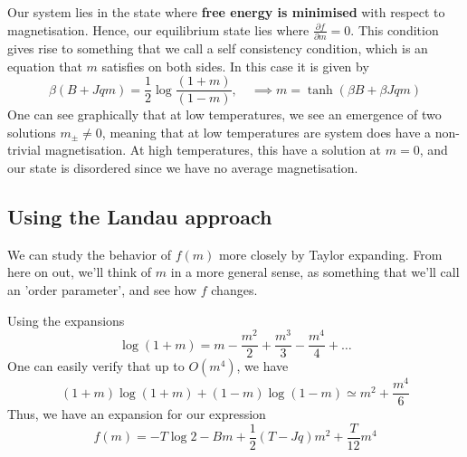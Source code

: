 \documentclass[11pt, oneside]{article}   	%
\begin{document}
Our system lies in the state where \textbf{free energy is minimised} with respect to magnetisation. Hence, our equilibrium state lies where $\frac{ \partial f }{ \partial m }  = 0 $. 
This condition gives rise to something that we call a self consistency condition, which is an equation that $m$ satisfies on both sides. In this case it is given by 
\[ 
	\beta ( B + Jqm ) = \frac{ 1}{2} \log \frac{ ( 1+ m )}{ ( 1- m ) }, \quad \implies m = \tanh ( \beta B + \beta J q m ) \]
One can see graphically that at low temperatures, we see an emergence of two solutions $m_{ \pm  } \neq 0$, meaning that at low temperatures are system does have a non-trivial magnetisation. At high temperatures, this have a solution at $m = 0$, and our state is disordered since we have no average magnetisation. 
 
\subsection{Using the Landau approach} 
We can study the behavior of $f(m)$ more closely by Taylor expanding. From here on out, we'll think of $m$ in a more general sense, as something that we'll call an 'order parameter', and see how $f$ changes. 

Using the expansions 
\[ 
	\log (1+ m) = m - \frac{ m^2}{2} + \frac{m^3}{ 3} - \frac{ m^4}{ 4}  + \dots 
\] 
One can easily verify that up to $O(m^ 4) $, we have 
\[ 
	(1 + m ) \log ( 1 + m) + ( 1 - m ) \log ( 1 - m ) \simeq  m ^2 + \frac{ m^4}{ 6} 
\] 
Thus, we have an expansion for our expression 
\[
	f(m ) =  - T\log 2  - Bm + \frac{1}{ 2} ( T  - Jq ) m^ 2 + \frac{T}{ 12} m^4 
\] 
\end{document}
